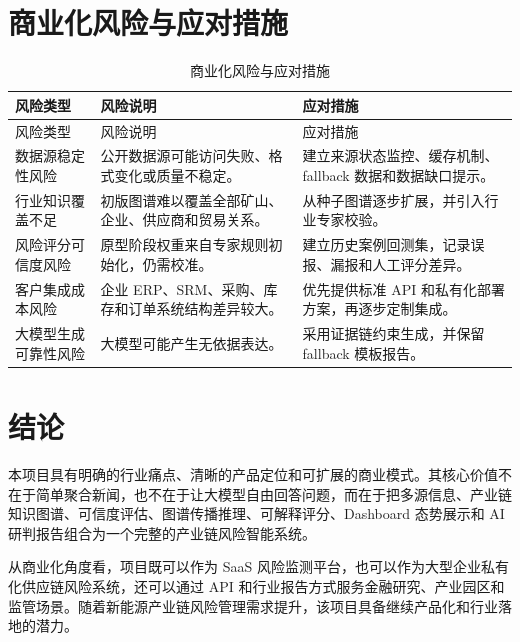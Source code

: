 \documentclass[12pt,a4paper]{ctexart}
\begin{document}
\section{商业化风险与应对措施}

\begin{longtable}{p{3.2cm}p{5.0cm}p{5.0cm}}
\caption{商业化风险与应对措施}\label{tab:risk}\\
\toprule
风险类型 & 风险说明 & 应对措施 \\
\midrule
\endfirsthead
\toprule
风险类型 & 风险说明 & 应对措施 \\
\midrule
\endhead
数据源稳定性风险 & 公开数据源可能访问失败、格式变化或质量不稳定。 & 建立来源状态监控、缓存机制、fallback 数据和数据缺口提示。 \\
行业知识覆盖不足 & 初版图谱难以覆盖全部矿山、企业、供应商和贸易关系。 & 从种子图谱逐步扩展，并引入行业专家校验。 \\
风险评分可信度风险 & 原型阶段权重来自专家规则初始化，仍需校准。 & 建立历史案例回测集，记录误报、漏报和人工评分差异。 \\
客户集成成本风险 & 企业 ERP、SRM、采购、库存和订单系统结构差异较大。 & 优先提供标准 API 和私有化部署方案，再逐步定制集成。 \\
大模型生成可靠性风险 & 大模型可能产生无依据表达。 & 采用证据链约束生成，并保留 fallback 模板报告。 \\
\bottomrule
\end{longtable}

\section{结论}

本项目具有明确的行业痛点、清晰的产品定位和可扩展的商业模式。其核心价值不在于简单聚合新闻，也不在于让大模型自由回答问题，而在于把多源信息、产业链知识图谱、可信度评估、图谱传播推理、可解释评分、Dashboard 态势展示和 AI 研判报告组合为一个完整的产业链风险智能系统。

从商业化角度看，项目既可以作为 SaaS 风险监测平台，也可以作为大型企业私有化供应链风险系统，还可以通过 API 和行业报告方式服务金融研究、产业园区和监管场景。随着新能源产业链风险管理需求提升，该项目具备继续产品化和行业落地的潜力。
\end{document}
